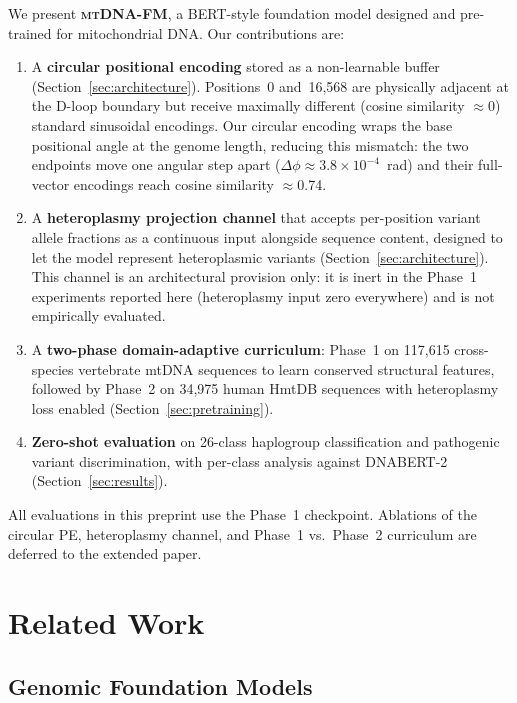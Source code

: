 \documentclass[10pt]{article}
\newcommand{\mtdnafm}{\textsc{mtDNA-FM}\xspace}
\begin{document}
We present \textbf{\mtdnafm}, a BERT-style \citep{devlin2018bert} foundation model designed and
pre-trained for mitochondrial DNA. Our contributions are:

\begin{enumerate}
\item A \textbf{circular positional encoding} stored as a non-learnable buffer
(Section~\ref{sec:architecture}). Positions~0 and~16,568 are physically adjacent at the D-loop
boundary but receive maximally different (cosine similarity $\approx$0) standard sinusoidal
encodings. Our circular encoding wraps the base positional angle at the genome length, reducing
this mismatch: the two endpoints move one angular step apart ($\Delta\phi \approx 3.8\times10^{-4}$~rad)
and their full-vector encodings reach cosine similarity $\approx$0.74.

\item A \textbf{heteroplasmy projection channel} that accepts per-position variant allele
fractions as a continuous input alongside sequence content, designed to let the model represent
heteroplasmic variants (Section~\ref{sec:architecture}). This channel is an architectural
provision only: it is inert in the Phase~1 experiments reported here (heteroplasmy input zero
everywhere) and is not empirically evaluated.

\item A \textbf{two-phase domain-adaptive curriculum}: Phase~1 on 117,615 cross-species
vertebrate mtDNA sequences to learn conserved structural features, followed by Phase~2 on
34,975 human HmtDB sequences with heteroplasmy loss enabled
(Section~\ref{sec:pretraining}).

\item \textbf{Zero-shot evaluation} on 26-class haplogroup classification and pathogenic variant
discrimination, with per-class analysis against DNABERT-2 (Section~\ref{sec:results}).
\end{enumerate}

All evaluations in this preprint use the Phase~1 checkpoint. Ablations of the circular PE,
heteroplasmy channel, and Phase~1 vs.\ Phase~2 curriculum are deferred to the extended paper.

\section{Related Work}

\subsection{Genomic Foundation Models}
\end{document}
